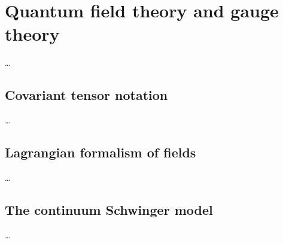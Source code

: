 \documentclass[../main.tex]{subfiles} %
\begin{document}
\chapter{Quantum field theory and gauge theory}

\ldots



\section{Covariant tensor notation}

\ldots



\section{Lagrangian formalism of fields}

\ldots



\section{The continuum Schwinger model}

\ldots
\end{document}
